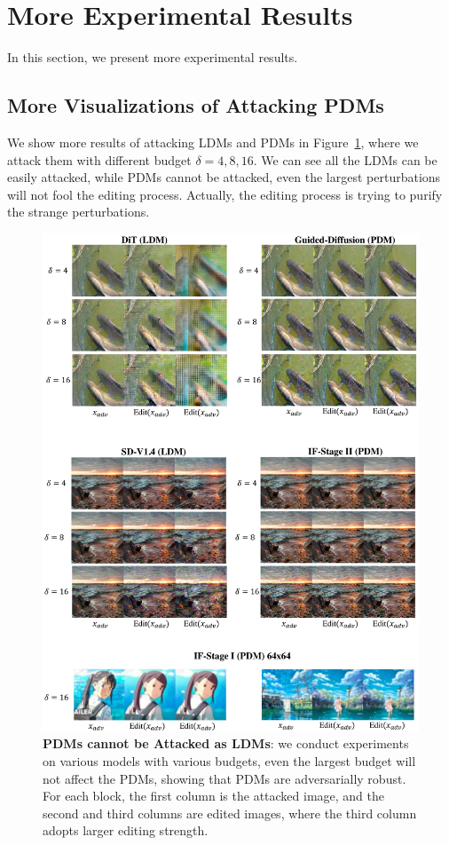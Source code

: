 \section{More Experimental Results}

In this section, we present more experimental results.

\subsection{More Visualizations of Attacking PDMs}

We show more results of attacking LDMs and PDMs in Figure~\ref{fig:supp:attacking_pdms}, where we attack them with different budget $\delta=4,8,16$. We can see all the LDMs can be easily attacked, while PDMs cannot be attacked, even the largest perturbations will not fool the editing process. Actually, the editing process is trying to purify the strange perturbations.

\begin{figure}
    \centering
    \includegraphics[width=.99\textwidth]{images/supp/supp_attacking_pdms.pdf}
    \caption{\textbf{PDMs cannot be Attacked as LDMs}: we conduct experiments on various models with various budgets, even the largest budget will not affect the PDMs, showing that PDMs are adversarially robust. For each block, the first column is the attacked image, and the second and third columns are edited images, where the third column adopts larger editing strength.}
    \label{fig:supp:attacking_pdms}
\end{figure}






